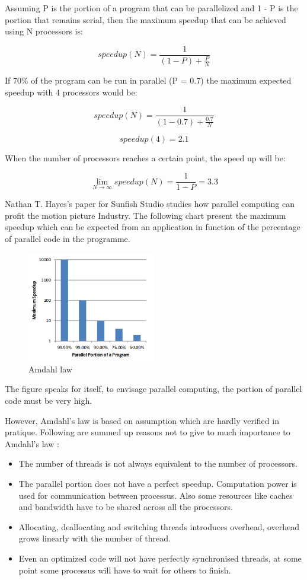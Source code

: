 Assuming P is the portion of a program that can be parallelized and 1 - P  is
the portion that remains serial, then the maximum speedup that can be achieved
using N processors is: 

$$speedup(N) = \frac{1}{(1-P) + \frac{P}{N}} $$

If 70\% of the program can be run in parallel (P = 0.7) the maximum expected
speedup with 4 processors would be:

$$speedup(N) = \frac{1}{(1-0.7) + \frac{0.7}{N}}$$

$$speedup(4) = 2.1$$

When the number of processors reaches a certain point, the speed up will be:


$$\lim\limits_{N \to \infty} speedup(N)= \frac{1}{1-P} = 3.3$$


Nathan T. Hayes's paper for Sunfish Studio \citep{Reference8} studies how
parallel computing can profit the motion picture Industry. The following chart
present the maximum speedup which can be expected from an application in
function of the percentage of parallel code in the programme.

\begin{figure}[H] 
  \centering
  \includegraphics[width=0.5\textwidth]{./Figures/amdahl.png}
  \caption[Amdahl law]{Amdahl law \citep{Reference8}} 
  \label{fig:amdahl} 
\end{figure}

The figure speaks for itself, to envisage parallel computing, the portion of
parallel code must be very high.

However, Amdahl's law is based on assumption which are hardly verified in
pratique. Following are summed up reasons not to give to much importance to
Amdahl's law \citep{Reference34}:

\begin{itemize} 
  \item The number of threads is not always equivalent to the number of processors.  
  \item The parallel portion does not have a perfect speedup. Computation power is used
    for communication between processus. Also some resources like caches and bandwidth
    have to be shared across all the processors.  
  \item Allocating, deallocating and switching threads introduces overhead, overhead grows
    linearly with the number of thread.  
  \item Even an optimized code will not have perfectly synchronised threads, at some point
    some processus will have to wait for others to finish.	
\end{itemize}


